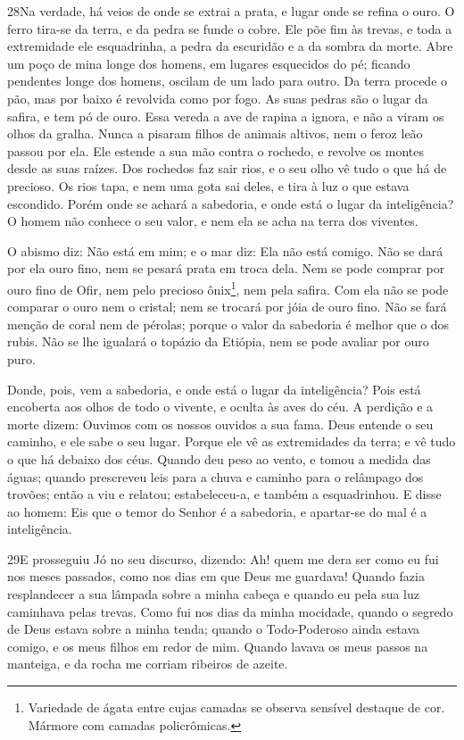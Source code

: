 \medskip

\lettrine{28} Na verdade, há veios de onde se extrai a prata,
e lugar onde se refina o ouro. O ferro tira-se da terra, e da
pedra se funde o cobre. Ele põe fim às trevas, e toda a
extremidade ele esquadrinha, a pedra da escuridão e a da sombra da
morte. Abre um poço de mina longe dos homens, em lugares
esquecidos do pé; ficando pendentes longe dos homens, oscilam de um
lado para outro. Da terra procede o pão, mas por baixo é
revolvida como por fogo. As suas pedras são o lugar da safira, e
tem pó de ouro. Essa vereda a ave de rapina a ignora, e não a
viram os olhos da gralha. Nunca a pisaram filhos de animais
altivos, nem o feroz leão passou por ela. Ele estende a sua mão
contra o rochedo, e revolve os montes desde as suas raízes.
Dos rochedos faz sair rios, e o seu olho vê tudo o que há de
precioso. Os rios tapa, e nem uma gota sai deles, e tira à
luz o que estava escondido. Porém onde se achará a sabedoria,
e onde está o lugar da inteligência? O homem não conhece o
seu valor, e nem ela se acha na terra dos viventes.

O abismo diz: Não está em mim; e o mar diz: Ela não está comigo.
Não se dará por ela ouro fino, nem se pesará prata em troca
dela. Nem se pode comprar por ouro fino de Ofir, nem pelo
precioso ônix\footnote{Variedade de ágata entre cujas camadas se
observa sensível destaque de cor. Mármore com camadas
policrômicas.}, nem pela safira. Com ela não se pode comparar
o ouro nem o cristal; nem se trocará por jóia de ouro fino.
Não se fará menção de coral nem de pérolas; porque o valor da
sabedoria é melhor que o dos rubis. Não se lhe igualará o
topázio da Etiópia, nem se pode avaliar por ouro puro.

Donde, pois, vem a sabedoria, e onde está o lugar da
inteligência? Pois está encoberta aos olhos de todo o
vivente, e oculta às aves do céu. A perdição e a morte dizem:
Ouvimos com os nossos ouvidos a sua fama. Deus entende o seu
caminho, e ele sabe o seu lugar. Porque ele vê as
extremidades da terra; e vê tudo o que há debaixo dos céus.
Quando deu peso ao vento, e tomou a medida das águas;
quando prescreveu leis para a chuva e caminho para o
relâmpago dos trovões; então a viu e relatou; estabeleceu-a,
e também a esquadrinhou. E disse ao homem: Eis que o temor do
Senhor é a sabedoria, e apartar-se do mal é a inteligência.

\medskip

\lettrine{29} E prosseguiu Jó no seu discurso, dizendo:
Ah! quem me dera ser como eu fui nos meses passados, como nos
dias em que Deus me guardava! Quando fazia resplandecer a sua
lâmpada sobre a minha cabeça e quando eu pela sua luz caminhava
pelas trevas. Como fui nos dias da minha mocidade, quando o
segredo de Deus estava sobre a minha tenda; quando o
Todo-Poderoso ainda estava comigo, e os meus filhos em redor de mim.
Quando lavava os meus passos na manteiga, e da rocha me corriam
ribeiros de azeite.

